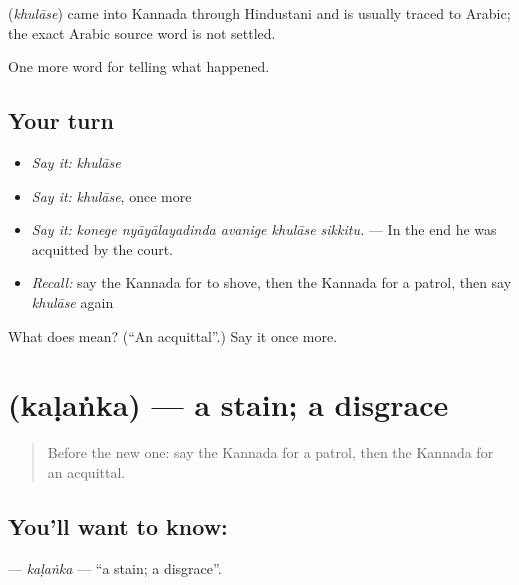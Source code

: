 \begin{cousinweb}
\textbf{} (\emph{khulāse}) came into Kannada through Hindustani and is usually traced to Arabic; the exact Arabic source word is not settled.
\end{cousinweb}

\begin{grammarlens}[title={What you've built}]
One more word for telling what happened.
\end{grammarlens}

\subsection*{Your turn}
\begin{itemize}
\raggedright
  \item \emph{Say it:} \emph{khulāse}
  \item \emph{Say it:} \emph{khulāse}, once more
  \item \emph{Say it:} \emph{konege nyāyālayadinda avanige khulāse sikkitu.} — In the end he was acquitted by the court.
  \item \emph{Recall:} say the Kannada for to shove, then the Kannada for a patrol, then say \emph{khulāse} again
\end{itemize}

\begin{tcolorbox}[breakable,colback=teal!4,colframe=teal!35!black,title={Before you move on}]
What does  mean? (\textquotedblleft{}An acquittal\textquotedblright{}.) Say it once more.
\end{tcolorbox}
\section[\texorpdfstring{\kn{ಕಳಂಕ} (kaḷaṅka)}{ಕಳಂಕ (kaḷaṅka)}]{ (kaḷaṅka) — a stain; a disgrace}

\label{lesson:KA-C366-kalanka}



\begin{quote}
Before the new one: say the Kannada for a patrol, then the Kannada for an acquittal.
\end{quote}

\subsection*{You'll want to know: }
\textbf{} — \emph{kaḷaṅka} — \textquotedblleft{}a stain; a disgrace\textquotedblright{}.

